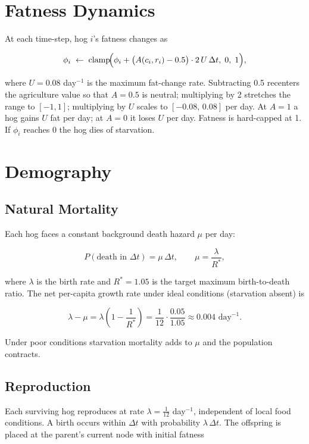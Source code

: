 \documentclass[11pt]{article}
\begin{document}
\section{Fatness Dynamics}

At each time-step, hog $i$'s fatness changes as

\[
  \phi_i \;\leftarrow\;
  \mathrm{clamp}\!\Bigl(
    \phi_i
    + \bigl(A(c_i,r_i) - 0.5\bigr)\cdot 2\,U\,\Delta t,
    \;0,\;1
  \Bigr),
\]

where $U = 0.08$ day$^{-1}$ is the maximum fat-change rate.  Subtracting 0.5
recenters the agriculture value so that $A = 0.5$ is neutral; multiplying by 2
stretches the range to $[-1, 1]$; multiplying by $U$ scales to
$[-0.08,\, 0.08]$ per day.  At $A = 1$ a hog gains $U$ fat per day; at
$A = 0$ it loses $U$ per day.  Fatness is hard-capped at 1.  If $\phi_i$
reaches 0 the hog dies of starvation.

\section{Demography}

\subsection{Natural Mortality}

Each hog faces a constant background death hazard $\mu$ per day:

\[
  P(\text{death in } \Delta t) = \mu\,\Delta t,
  \qquad
  \mu = \frac{\lambda}{R^*},
\]

where $\lambda$ is the birth rate and $R^* = 1.05$ is the target maximum
birth-to-death ratio.  The net per-capita growth rate under ideal conditions
(starvation absent) is

\[
  \lambda - \mu = \lambda\!\left(1 - \frac{1}{R^*}\right)
               = \frac{1}{12} \cdot \frac{0.05}{1.05}
               \approx 0.004 \text{ day}^{-1}.
\]

Under poor conditions starvation mortality adds to $\mu$ and the population
contracts.

\subsection{Reproduction}

Each surviving hog reproduces at rate $\lambda = \tfrac{1}{12}$ day$^{-1}$,
independent of local food conditions.  A birth occurs within $\Delta t$ with
probability $\lambda\,\Delta t$.  The offspring is placed at the parent's
current node with initial fatness
\end{document}
